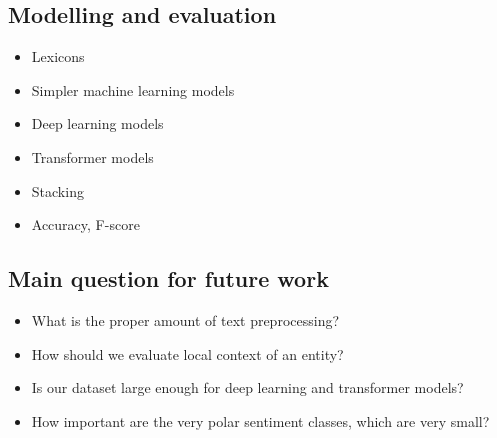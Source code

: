 \documentclass[11pt,a4paper]{article}
\begin{document}
\subsection{Modelling and evaluation}
\begin{itemize}
  \item Lexicons
  \item Simpler machine learning models
  \item Deep learning models
  \item Transformer models
  \item Stacking
  \item Accuracy, F-score
\end{itemize}

\subsection{Main question for future work}
\begin{itemize}
  \item What is the proper amount of text preprocessing?
  \item How should we evaluate local context of an entity?
  \item Is our dataset large enough for deep learning and transformer models?
  \item How important are the very polar sentiment classes, which are very small?
\end{itemize}




\end{document}
